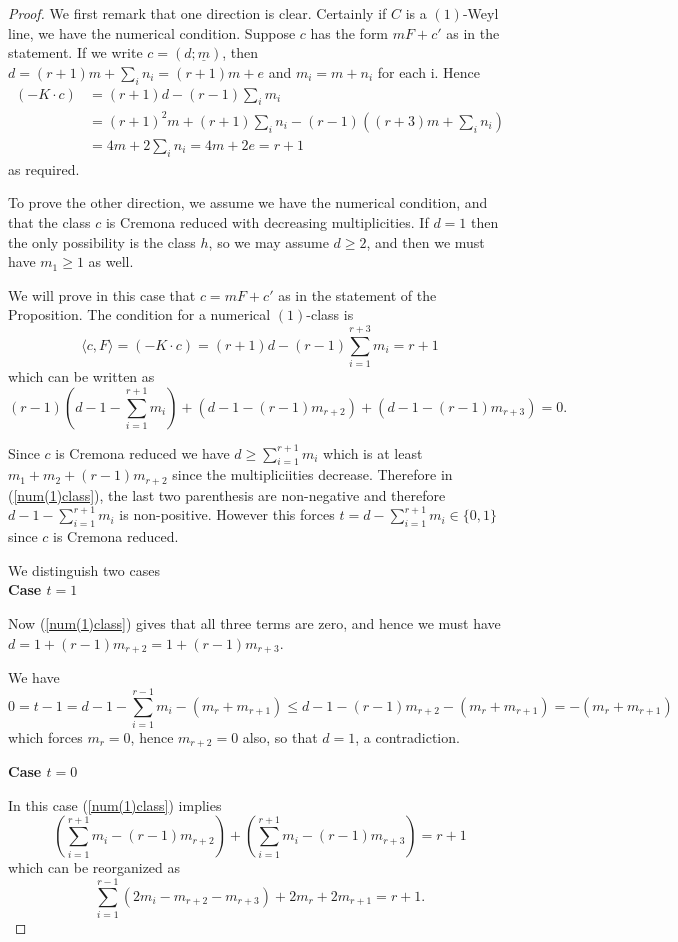 \documentclass[12pt]{article}
\numberwithin{equation}{section}
\numberwithin{subeq}{equation}
\begin{document}
\begin{proof}
We first remark that one direction is clear.
Certainly if $C$ is a $(1)$-Weyl line,
we have the numerical condition.
Suppose $c$ has the form $mF+c'$ as in the statement.
If we write $c = (d;\underline{m})$,
then $d = (r+1)m+\sum_i n_i = (r+1)m+e$
and $m_i = m+n_i$ for each i.
Hence
\begin{align*}
(-K \cdot c) &= (r+1)d-(r-1)\sum_i m_i \\
&= (r+1)^2m + (r+1)\sum_i n_i - (r-1)((r+3)m+\sum_i n_i) \\
&= 4m + 2\sum_i n_i  = 4m+2e = r+1
\end{align*}
as required.



To prove the other direction, we assume we have the numerical condition,
and that the class $c$ is Cremona reduced with decreasing multiplicities.
If $d=1$ then the only possibility is the class $h$,
so we may assume $d\geq 2$,
and then we must have $m_1 \geq 1$ as well.


We will prove in this case that $c = mF+c'$ as in the statement of the Proposition.
The condition for a numerical $(1)$-class is
\[
\langle c, F \rangle = (-K \cdot c) =  (r+1)d-(r-1)\sum_{i=1}^{r+3} m_i = r+1
\]
which can be written as
\begin{equation}\label{num(1)class}
(r-1)(d-1-\sum_{i=1}^{r+1} m_i) + (d-1-(r-1)m_{r+2})+(d-1-(r-1)m_{r+3})=0.
\end{equation}

Since $c$ is Cremona reduced we have $d \geq \sum_{i=1}^{r+1} m_i$
which is at least $m_1+m_2+(r-1)m_{r+2}$ since the multipliciities decrease.
Therefore in (\ref{num(1)class}),
the last two parenthesis are non-negative
and therefore $d-1-\sum_{i=1}^{r+1}m_i$ is non-positive.
However this forces $t =d-\sum_{i=1}^{r+1}m_i \in \{0,1\}$
since $c$ is Cremona reduced.


We distinguish two cases\\
\medskip\noindent \textbf{Case $t=1$}


Now (\ref{num(1)class}) gives that all three terms are zero,
and hence we must have $d=1+(r-1)m_{r+2}=1+(r-1)m_{r+3}$.

We have
\[
0=t-1 = d-1 - \sum_{i=1}^{r-1} m_i -(m_r+m_{r+1})
\leq d-1 -(r-1)m_{r+2} -(m_r+m_{r+1}) = -(m_r+m_{r+1})
\]
which forces $m_r=0$, hence $m_{r+2}=0$ also, so that $d=1$,
a contradiction.

\medskip\noindent \textbf{Case $t=0$} 

In this case  (\ref{num(1)class}) implies
\[
(\sum_{i=1}^{r+1} m_i -(r-1) m_{r+2}) + (\sum_{i=1}^{r+1} m_i -(r-1)m_{r+3}) = r+1
\]
which can be reorganized as
\begin{equation}\label{equua}
\sum_{i=1}^{r-1}(2m_i-m_{r+2}-m_{r+3})+2m_r+2m_{r+1} =r+1.
\end{equation}


\end{proof}
\end{document}

